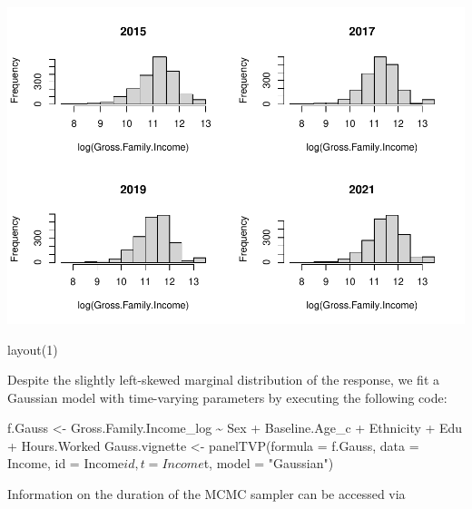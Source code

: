 \documentclass[a4paper, preprint, 3p,
authoryear]{elsarticle} %
\newenvironment{Shaded}{\begin{snugshade}}{\end{snugshade}}
\newcommand{\NormalTok}[1]{#1}
\newcommand{\pandocbounded}[1]{#1}
\begin{document}
\pandocbounded{\includegraphics[keepaspectratio]{Vignette-for-panelTVP_files/figure-latex/unnamed-chunk-12-1.pdf}}

\begin{Shaded}
\begin{Highlighting}[]
\NormalTok{layout(1)}
\end{Highlighting}
\end{Shaded}

Despite the slightly left-skewed marginal distribution of the response,
we fit a Gaussian model with time-varying parameters by executing the
following code:

\begin{Shaded}
\begin{Highlighting}[]
\NormalTok{f.Gauss \textless{}{-} Gross.Family.Income\_log \textasciitilde{} Sex + Baseline.Age\_c + Ethnicity + Edu + Hours.Worked}
\NormalTok{Gauss.vignette \textless{}{-} panelTVP(formula = f.Gauss,}
\NormalTok{                           data = Income,}
\NormalTok{                           id = Income$id,}
\NormalTok{                           t = Income$t,}
\NormalTok{                           model = "Gaussian")}
\end{Highlighting}
\end{Shaded}

Information on the duration of the MCMC sampler can be accessed via

\begin{Shaded}
\end{Shaded}
\end{document}
